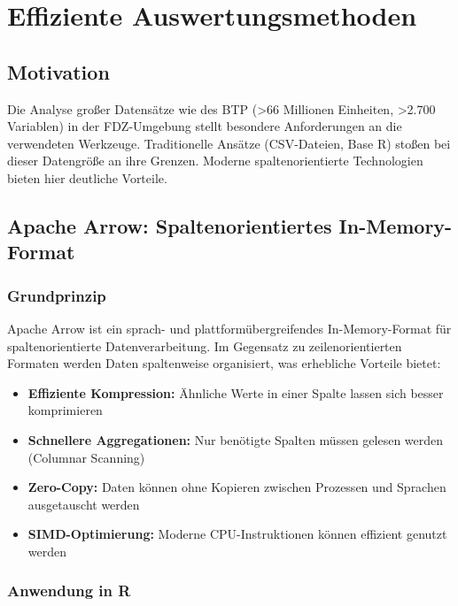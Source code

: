 \documentclass[
  ngerman,
  10pt,
  letterpaper,
  twocolumn]{book}
\providecommand{\tightlist}{%
  \setlength{\itemsep}{0pt}\setlength{\parskip}{0pt}}
\begin{document}

\chapter{Effiziente Auswertungsmethoden}\label{sec-methoden}

\section{Motivation}\label{motivation}

Die Analyse großer Datensätze wie des BTP (\textgreater66 Millionen
Einheiten, \textgreater2.700 Variablen) in der FDZ-Umgebung stellt
besondere Anforderungen an die verwendeten Werkzeuge. Traditionelle
Ansätze (CSV-Dateien, Base R) stoßen bei dieser Datengröße an ihre
Grenzen. Moderne spaltenorientierte Technologien bieten hier deutliche
Vorteile.

\section{Apache Arrow: Spaltenorientiertes
In-Memory-Format}\label{apache-arrow-spaltenorientiertes-in-memory-format}

\subsection{Grundprinzip}\label{grundprinzip}

Apache Arrow ist ein sprach- und plattformübergreifendes
In-Memory-Format für spaltenorientierte Datenverarbeitung. Im Gegensatz
zu zeilenorientierten Formaten werden Daten spaltenweise organisiert,
was erhebliche Vorteile bietet:

\begin{itemize}
\tightlist
\item
  \textbf{Effiziente Kompression:} Ähnliche Werte in einer Spalte lassen
  sich besser komprimieren
\item
  \textbf{Schnellere Aggregationen:} Nur benötigte Spalten müssen
  gelesen werden (Columnar Scanning)
\item
  \textbf{Zero-Copy:} Daten können ohne Kopieren zwischen Prozessen und
  Sprachen ausgetauscht werden
\item
  \textbf{SIMD-Optimierung:} Moderne CPU-Instruktionen können effizient
  genutzt werden
\end{itemize}

\subsection{Anwendung in R}\label{anwendung-in-r}
\end{document}
